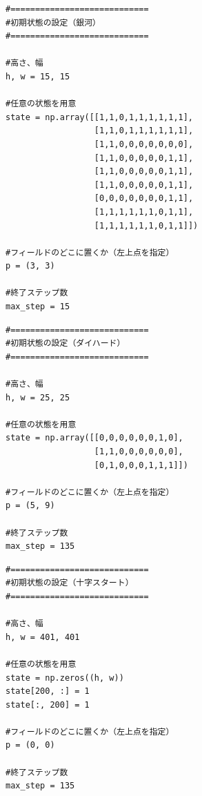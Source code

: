 \documentclass[uplatex,a4paper,11pt,oneside,openany]{jsbook}
\begin{document}
\begin{lstlisting}[caption=life01,label=life01]
#============================
#初期状態の設定（銀河）
#============================

#高さ、幅
h, w = 15, 15

#任意の状態を用意
state = np.array([[1,1,0,1,1,1,1,1,1],
                  [1,1,0,1,1,1,1,1,1],
                  [1,1,0,0,0,0,0,0,0],
                  [1,1,0,0,0,0,0,1,1],
                  [1,1,0,0,0,0,0,1,1],
                  [1,1,0,0,0,0,0,1,1],
                  [0,0,0,0,0,0,0,1,1],
                  [1,1,1,1,1,1,0,1,1],
                  [1,1,1,1,1,1,0,1,1]])

#フィールドのどこに置くか（左上点を指定）
p = (3, 3)

#終了ステップ数
max_step = 15
\end{lstlisting}%

\begin{lstlisting}[caption=life02,label=life02]
#============================
#初期状態の設定（ダイハード）
#============================

#高さ、幅
h, w = 25, 25

#任意の状態を用意
state = np.array([[0,0,0,0,0,0,1,0],
                  [1,1,0,0,0,0,0,0],
                  [0,1,0,0,0,1,1,1]])

#フィールドのどこに置くか（左上点を指定）
p = (5, 9)

#終了ステップ数
max_step = 135
\end{lstlisting}%

\begin{lstlisting}[caption=life03,label=life03]
#============================
#初期状態の設定（十字スタート）
#============================

#高さ、幅
h, w = 401, 401

#任意の状態を用意
state = np.zeros((h, w))
state[200, :] = 1
state[:, 200] = 1

#フィールドのどこに置くか（左上点を指定）
p = (0, 0)

#終了ステップ数
max_step = 135
\end{lstlisting}%
\end{document}
